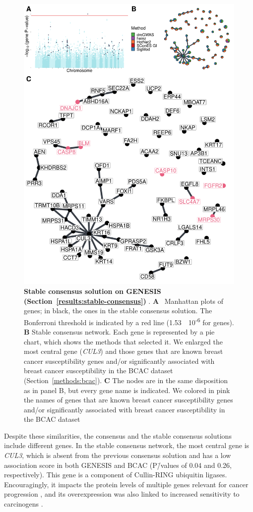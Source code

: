 \documentclass[10pt,letterpaper]{article}
\begin{document}
\begin{figure}[!ht]
  \centering
  \includegraphics[width=.8\linewidth]{./figures/figure_5.pdf}
  \caption{ {\bf Stable consensus solution on GENESIS (Section~\ref{results:stable-consensus}) }. \textbf{A} ~Manhattan plots of genes; in black, the ones in the stable consensus solution. The Bonferroni threshold is indicated by a red line (1.53~\texttimes{}~10\textsuperscript{-6} for genes). \textbf{B} Stable consensus network. Each gene is represented by a pie chart, which shows the methods that selected it. We enlarged the most central gene (\emph{CUL3}) and those genes that are known breast cancer susceptibility genes and/or significantly associated with breast cancer susceptibility in the BCAC dataset (Section~\ref{methods:bcac}). \textbf{C} The nodes are in the same disposition as in panel B, but every gene name is indicated. We colored in pink the names of genes that are known breast cancer susceptibility genes and/or significantly associated with breast cancer susceptibility in the BCAC dataset}
  \label{fig:stable-consensus}
  \end{figure}

Despite these similarities, the consensus and the stable consensus solutions include different genes. In the stable consensus network, the most central gene is \emph{CUL3}, which is absent from the previous consensus solution and has a low association score in both GENESIS and BCAC (P\=/values of 0.04 and 0.26, respectively). This gene is a component of Cullin-RING ubiquitin ligases. Encouragingly, it impacts the protein levels of multiple genes relevant for cancer progression \cite{Chen2016}, and its overexpression was also linked to increased sensitivity to carcinogens \cite{Loignon2009}.
\end{document}
